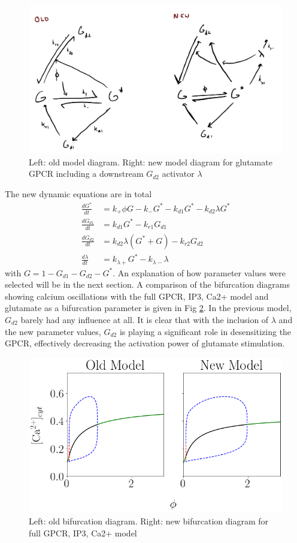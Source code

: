 \documentclass[12pt]{article}
\begin{document}
\begin{figure}[H]
	\includegraphics[width=0.7\linewidth]{new_GPCR_model.jpg}
	\centering
	\caption{Left: old model diagram. Right: new model diagram for glutamate GPCR including a downstream $G_{d2}$ activator $\lambda$}
	\label{fig:new_GPCR_model}
\end{figure}

The new dynamic equations are in total
\begin{align}
\frac{dG^*}{dt} &= k_+ \phi G - k_- G^* - k_{d1} G^* - k_{d2}\lambda G^*\\
\frac{dG_{d1}}{dt} &= k_{d1}G^* - k_{r1} G_{d1} \\
\frac{dG_{d2}}{dt} &= k_{d2}\lambda(G^*+G) - k_{r2} G_{d2} \\
\frac{d\lambda}{dt} &= k_{\lambda+}G^* - k_{\lambda-}\lambda
\end{align}
with $G = 1 - G_{d1} - G_{d2} - G^*$. An explanation of how parameter values were selected will be in the next section. A comparison of the bifurcation diagrams showing calcium oscillations with the full GPCR, IP3, Ca2+ model and glutamate as a bifurcation parameter is given in Fig \ref{fig:new_bifurcation}. In the previous model, $G_{d2}$ barely had any influence at all. It is clear that with the inclusion of $\lambda$ and the new parameter values, $G_{d2}$ is playing a significant role in desensitizing the GPCR, effectively decreasing the activation power of glutamate stimulation.

\begin{figure}[H]
	\includegraphics[width=0.7\linewidth]{c_glut_bifurcation_new.png}
	\centering
	\caption{Left: old bifurcation diagram. Right: new bifurcation diagram for full GPCR, IP3, Ca2+ model}
	\label{fig:new_bifurcation}
\end{figure}
\end{document}
